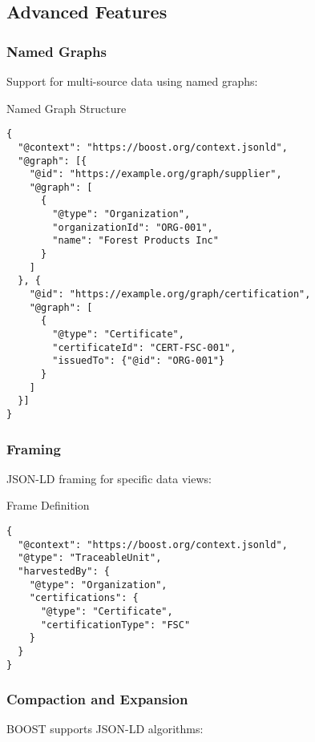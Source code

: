 \subsection{Advanced Features}
\label{sec:jsonld-advanced}

\subsubsection{Named Graphs}

Support for multi-source data using named graphs:

\begin{jsonexample}{Named Graph Structure}
\begin{verbatim}
{
  "@context": "https://boost.org/context.jsonld",
  "@graph": [{
    "@id": "https://example.org/graph/supplier",
    "@graph": [
      {
        "@type": "Organization",
        "organizationId": "ORG-001",
        "name": "Forest Products Inc"
      }
    ]
  }, {
    "@id": "https://example.org/graph/certification",
    "@graph": [
      {
        "@type": "Certificate",
        "certificateId": "CERT-FSC-001",
        "issuedTo": {"@id": "ORG-001"}
      }
    ]
  }]
}
\end{verbatim}
\end{jsonexample}

\subsubsection{Framing}

JSON-LD framing for specific data views:

\begin{jsonexample}{Frame Definition}
\begin{verbatim}
{
  "@context": "https://boost.org/context.jsonld",
  "@type": "TraceableUnit",
  "harvestedBy": {
    "@type": "Organization",
    "certifications": {
      "@type": "Certificate",
      "certificationType": "FSC"
    }
  }
}
\end{verbatim}
\end{jsonexample}

\subsubsection{Compaction and Expansion}

BOOST supports JSON-LD algorithms:

